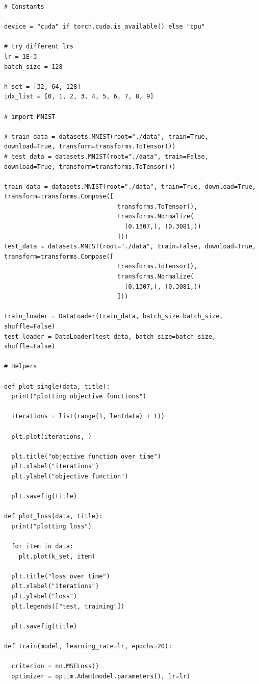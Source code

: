 \documentclass{article}
\newcommand{\1}{\mathbf{1}}
\begin{document}
{\begin{verbatim}
# Constants 

device = "cuda" if torch.cuda.is_available() else "cpu"

# try different lrs
lr = 1E-3
batch_size = 128

h_set = [32, 64, 128]
idx_list = [0, 1, 2, 3, 4, 5, 6, 7, 8, 9]

# import MNIST

# train_data = datasets.MNIST(root="./data", train=True, download=True, transform=transforms.ToTensor())
# test_data = datasets.MNIST(root="./data", train=False, download=True, transform=transforms.ToTensor())

train_data = datasets.MNIST(root="./data", train=True, download=True, transform=transforms.Compose([
                               transforms.ToTensor(),
                               transforms.Normalize(
                                 (0.1307,), (0.3081,))
                               ]))
test_data = datasets.MNIST(root="./data", train=False, download=True, transform=transforms.Compose([
                               transforms.ToTensor(),
                               transforms.Normalize(
                                 (0.1307,), (0.3081,))
                               ]))

train_loader = DataLoader(train_data, batch_size=batch_size, shuffle=False)
test_loader = DataLoader(test_data, batch_size=batch_size, shuffle=False)

# Helpers

def plot_single(data, title):
  print("plotting objective functions")

  iterations = list(range(1, len(data) + 1))

  plt.plot(iterations, )

  plt.title("objective function over time")
  plt.xlabel("iterations")
  plt.ylabel("objective function")

  plt.savefig(title)

def plot_loss(data, title):
  print("plotting loss")

  for item in data:
    plt.plot(k_set, item)

  plt.title("loss over time")
  plt.xlabel("iterations")
  plt.ylabel("loss")
  plt.legends(["test, training"])

  plt.savefig(title)

def train(model, learning_rate=lr, epochs=20):

  criterion = nn.MSELoss()
  optimizer = optim.Adam(model.parameters(), lr=lr)


\end{verbatim}}
\end{document}
